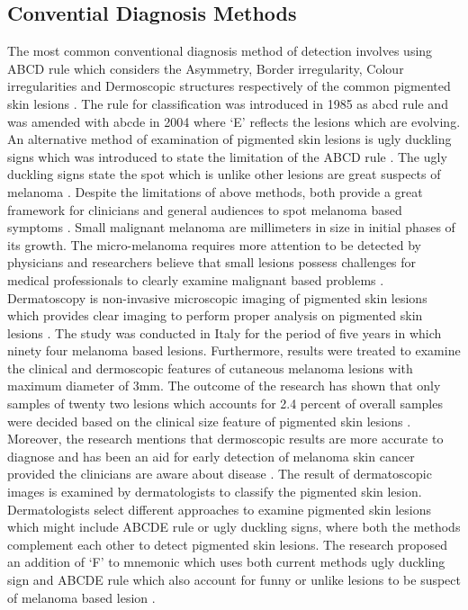 \subsection{Convential Diagnosis Methods}

The most common conventional diagnosis method of detection involves
using ABCD rule which considers the Asymmetry, Border irregularity,
Colour irregularities and  Dermoscopic structures respectively of the
common pigmented skin lesions \citep{LOESCHER2013170}. 
The rule for classification was introduced in 1985 as abcd 
rule and was amended with abcde in 2004 where ‘E’ reflects the 
lesions which are evolving. An alternative method of examination of
pigmented skin lesions is  ugly duckling signs which was introduced 
to state the limitation of the ABCD rule \citep{DanielJensen2015}.
The ugly duckling signs state the spot which is unlike other 
lesions are great suspects of melanoma \citep{grob1998ugly}.
Despite the limitations of above methods, both provide a great
framework for clinicians and general audiences to spot melanoma 
based symptoms \citep{DanielJensen2015}.
Small malignant melanoma are millimeters in size in initial phases
of its growth.  The micro-melanoma requires more attention to be
detected by physicians and researchers believe that small 
lesions possess challenges for medical professionals to 
clearly examine malignant based problems \citep{doi:10.1177/030089160409000125}.
Dermatoscopy is non-invasive microscopic imaging of pigmented skin 
lesions which provides clear imaging to perform proper analysis on 
pigmented skin lesions \citep{LOESCHER2013170}. 
The study was conducted in Italy for the period of five years in 
which ninety four melanoma based lesions. Furthermore, results 
were treated to examine the clinical and dermoscopic features of 
cutaneous melanoma lesions with maximum diameter of 3mm. 
The outcome of the research has shown that only samples of twenty two lesions which 
accounts for 2.4 percent of overall samples were decided based on
the clinical size feature of pigmented skin lesions \citep{doi:10.1177/030089160409000125}.
Moreover, the research mentions that dermoscopic results are more accurate to diagnose 
and has been an aid for early detection of melanoma skin cancer 
provided the clinicians are aware about disease \citep{doi:10.1177/030089160409000125}.
The result of dermatoscopic images is examined by dermatologists to classify the pigmented skin lesion.
Dermatologists select different approaches to examine pigmented
skin lesions which might include ABCDE rule or ugly duckling signs, 
where both the methods complement each other to detect pigmented skin lesions. 
The research proposed an addition of ‘F’ to mnemonic which uses both 
current methods ugly duckling sign and ABCDE rule which also account 
for funny or unlike lesions to be suspect of melanoma based lesion \citep{doi:10.1177/030089160409000125}.

